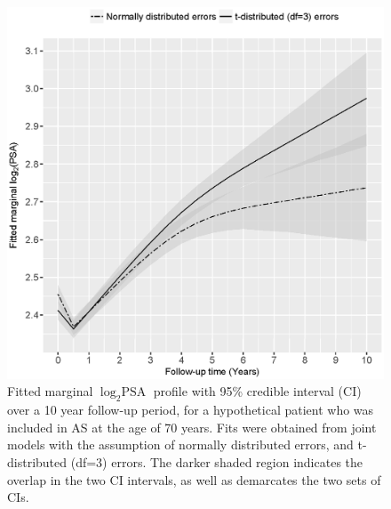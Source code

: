 \begin{enumerate}
    \begin{figure}[!htb]
    \centerline{\includegraphics[width=0.75\columnwidth]{../images/model_fit/marginal_fitted_psa_NormalVsT3.eps}}
    \caption{Fitted marginal $\log_2 \mbox{PSA}$ profile with 95\% credible interval (CI) over a 10 year follow-up period, for a hypothetical patient who was included in AS at the age of 70 years. Fits were obtained from joint models with the assumption of normally distributed errors, and t-distributed (df=3) errors. The darker shaded region indicates the overlap in the two CI intervals, as well as demarcates the two sets of CIs.}
    \label{fig : marginal_fitted_psa_NormalVsT3}
    \end{figure}        
    

\end{enumerate}
